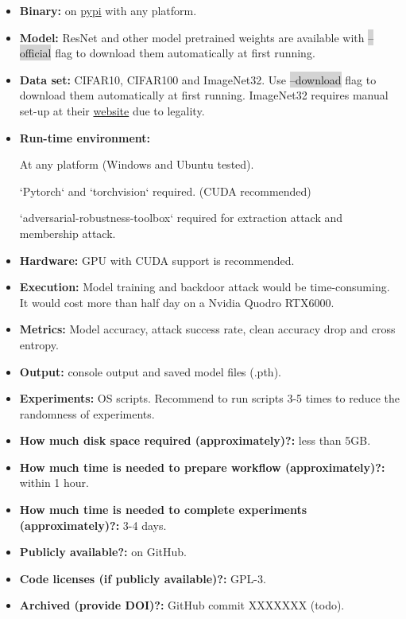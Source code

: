 \documentclass[letterpaper,twocolumn,10pt]{article}
\begin{document}
{\small
\begin{itemize}
    \item {\bf Binary: }on \href{https://pypi.org/project/autovul/}{pypi} with any platform.
    \item {\bf Model: }ResNet and other model pretrained weights are available with \colorbox{lightgray}{--official} flag to download them automatically at first running.
    \item {\bf Data set: }CIFAR10, CIFAR100 and ImageNet32. Use \colorbox{lightgray}{--download} flag to download them automatically at first running. ImageNet32 requires manual set-up at their \href{https://image-net.org/download-images.php}{website} due to legality.
    \item {\bf Run-time environment: }

          At any platform (Windows and Ubuntu tested).

          `Pytorch` and `torchvision` required. (CUDA recommended)

          `adversarial-robustness-toolbox` required for extraction attack and membership attack.
    \item {\bf Hardware: }GPU with CUDA support is recommended.
    \item {\bf Execution: }Model training and backdoor attack would be time-consuming. It would cost more than half day on a Nvidia Quodro RTX6000.
    \item {\bf Metrics: }Model accuracy, attack success rate, clean accuracy drop and cross entropy.
    \item {\bf Output: }console output and saved model files (.pth).
    \item {\bf Experiments: }OS scripts. Recommend to run scripts 3-5 times to reduce the randomness of experiments.
    \item {\bf How much disk space required (approximately)?: }less than 5GB.
    \item {\bf How much time is needed to prepare workflow (approximately)?: }within 1 hour.
    \item {\bf How much time is needed to complete experiments (approximately)?: }3-4 days.
    \item {\bf Publicly available?: }on GitHub.
    \item {\bf Code licenses (if publicly available)?: }GPL-3.
    \item {\bf Archived (provide DOI)?: }GitHub commit XXXXXXX (todo).
\end{itemize}

}
\end{document}
